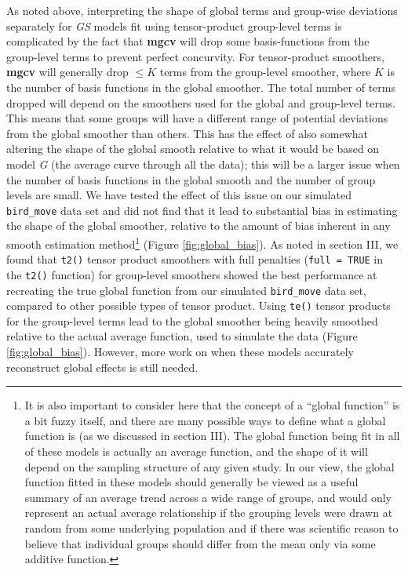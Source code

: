 \documentclass[12pt]{article}
\let\rmarkdownfootnote\footnote%
\def\footnote{\protect\rmarkdownfootnote}
\begin{document}
As noted above, interpreting the shape of global terms and group-wise
deviations separately for \emph{GS} models fit using tensor-product
group-level terms is complicated by the fact that \textbf{mgcv} will
drop some basis-functions from the group-level terms to prevent perfect
concurvity. For tensor-product smoothers, \textbf{mgcv} will generally
drop \(\le K\) terms from the group-level smoother, where \(K\) is the
number of basis functions in the global smoother. The total number of
terms dropped will depend on the smoothers used for the global and
group-level terms. This means that some groups will have a different
range of potential deviations from the global smoother than others. This
has the effect of also somewhat altering the shape of the global smooth
relative to what it would be based on model \emph{G} (the average curve
through all the data); this will be a larger issue when the number of
basis functions in the global smooth and the number of group levels are
small. We have tested the effect of this issue on our simulated
\texttt{bird\_move} data set and did not find that it lead to
substantial bias in estimating the shape of the global smoother,
relative to the amount of bias inherent in any smooth estimation
method\footnote{It is also important to consider here that the concept
  of a ``global function'' is a bit fuzzy itself, and there are many
  possible ways to define what a global function is (as we discussed in
  section III). The global function being fit in all of these models is
  actually an average function, and the shape of it will depend on the
  sampling structure of any given study. In our view, the global
  function fitted in these models should generally be viewed as a useful
  summary of an average trend across a wide range of groups, and would
  only represent an actual average relationship if the grouping levels
  were drawn at random from some underlying population and if there was
  scientific reason to believe that individual groups should differ from
  the mean only via some additive function.} (Figure
\ref{fig:global_bias}). As noted in section III, we found that
\texttt{t2()} tensor product smoothers with full penalties
(\texttt{full\ =\ TRUE} in the \texttt{t2()} function) for group-level
smoothers showed the best performance at recreating the true global
function from our simulated \texttt{bird\_move} data set, compared to
other possible types of tensor product. Using \texttt{te()} tensor
products for the group-level terms lead to the global smoother being
heavily smoothed relative to the actual average function, used to
simulate the data (Figure \ref{fig:global_bias}). However, more work on
when these models accurately reconstruct global effects is still needed.
\end{document}
